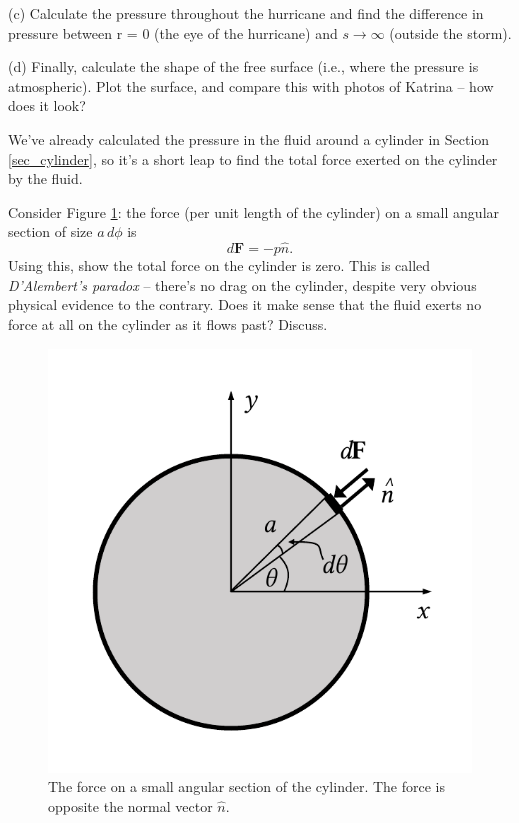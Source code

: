 \begin{problem}
(c) Calculate the pressure throughout the hurricane and find the difference in pressure between r = 0 (the eye of the hurricane) and $s \to \infty$ (outside the storm).

(d) Finally, calculate the shape of the free surface (i.e., where the pressure is atmospheric). Plot the surface, and compare this with photos of Katrina -- how does it look?



\end{problem}



\begin{problem}
\label{prob_force1}
We've already calculated the pressure in the fluid around a cylinder in Section \ref{sec_cylinder}, so it's a short leap to find the total force exerted on the cylinder by the fluid.

Consider Figure \ref{fig_cylinder_force}:  the force (per unit length of the cylinder) on a small angular section of size $a \, d\phi$ is
\[
d\textbf{F} = - p \hat{n}.
\]
Using this, show the total force on the cylinder is zero.  This is called \emph{D'Alembert's paradox} -- there's no drag on the cylinder, despite very obvious physical evidence to the contrary.  Does it make sense that the fluid exerts no force at all on the cylinder as it flows past?  Discuss.

\begin{figure}[t]
\centering\includegraphics[width=0.5\linewidth]{Figures/Chapter3/fig_cyl_force}
\caption{The force on a small angular section of the cylinder.  The force is opposite the normal vector $\hat{n}$.}
\label{fig_cylinder_force}
\end{figure}
\end{problem}


